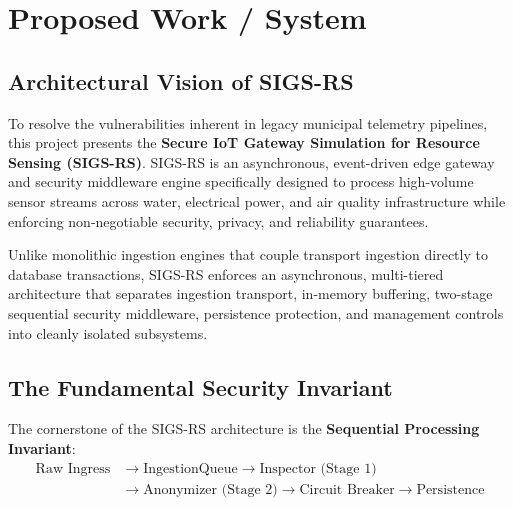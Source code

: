 \documentclass[a4paper]{article}
\begin{document}
\section{Proposed Work / System}

\subsection{Architectural Vision of SIGS-RS}
To resolve the vulnerabilities inherent in legacy municipal telemetry pipelines, this project presents the \textbf{Secure IoT Gateway Simulation for Resource Sensing (SIGS-RS)}. SIGS-RS is an asynchronous, event-driven edge gateway and security middleware engine specifically designed to process high-volume sensor streams across water, electrical power, and air quality infrastructure while enforcing non-negotiable security, privacy, and reliability guarantees.

Unlike monolithic ingestion engines that couple transport ingestion directly to database transactions, SIGS-RS enforces an asynchronous, multi-tiered architecture that separates ingestion transport, in-memory buffering, two-stage sequential security middleware, persistence protection, and management controls into cleanly isolated subsystems.

\subsection{The Fundamental Security Invariant}
The cornerstone of the SIGS-RS architecture is the \textbf{Sequential Processing Invariant}:
\begin{equation}
\label{eq:invariant}
\begin{aligned}
\text{Raw Ingress} &\longrightarrow \text{IngestionQueue} \longrightarrow \text{Inspector (Stage 1)} \\
&\longrightarrow \text{Anonymizer (Stage 2)} \longrightarrow \text{Circuit Breaker} \longrightarrow \text{Persistence}
\end{aligned}
\end{equation}
\end{document}
